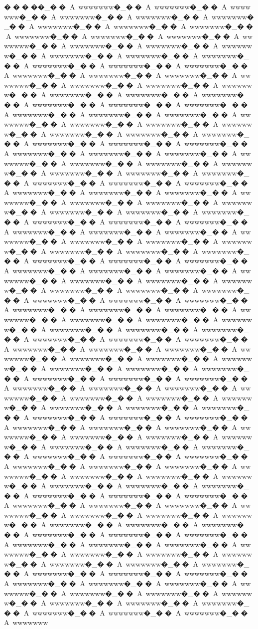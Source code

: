 {{{{{{{{{{{{{{{{{{{{{{{{{{{{{{{{{{{{{{{{{{{{{{{{{�����_��A~wwwwwww�_��A~wwwwwww�_��A~wwwwwww�_��A~wwwwwww�_��A~wwwwwww�_��A~wwwwwww�_��A~wwwwwww�_��A~wwwwwww�_��A~wwwwwww�_��A~wwwwwww�_��A~wwwwwww�_��A~wwwwwww�_��A~wwwwwww�_��A~wwwwwww�_��A~wwwwwww�_��A~wwwwwww�_��A~wwwwwww�_��A~wwwwwww�_��A~wwwwwww�_��A~wwwwwww�_��A~wwwwwww�_��A~wwwwwww�_��A~wwwwwww�_��A~wwwwwww�_��A~wwwwwww�_��A~wwwwwww�_��A~wwwwwww�_��A~wwwwwww�_��A~wwwwwww�_��A~wwwwwww�_��A~wwwwwww�_��A~wwwwwww�_��A~wwwwwww�_��A~wwwwwww�_��A~wwwwwww�_��A~wwwwwww�_��A~wwwwwww�_��A~wwwwwww�_��A~wwwwwww�_��A~wwwwwww�_��A~wwwwwww�_��A~wwwwwww�_��A~wwwwwww�_��A~wwwwwww�_��A~wwwwwww�_��A~wwwwwww�_��A~wwwwwww�_��A~wwwwwww�_��A~wwwwwww�_��A~wwwwwww�_��A~wwwwwww�_��A~wwwwwww�_��A~wwwwwww�_��A~wwwwwww�_��A~wwwwwww�_��A~wwwwwww�_��A~wwwwwww�_��A~wwwwwww�_��A~wwwwwww�_��A~wwwwwww�_��A~wwwwwww�_��A~wwwwwww�_��A~wwwwwww�_��A~wwwwwww�_��A~wwwwwww�_��A~wwwwwww�_��A~wwwwwww�_��A~wwwwwww�_��A~wwwwwww�_��A~wwwwwww�_��A~wwwwwww�_��A~wwwwwww�_��A~wwwwwww�_��A~wwwwwww�_��A~wwwwwww�_��A~wwwwwww�_��A~wwwwwww�_��A~wwwwwww�_��A~wwwwwww�_��A~wwwwwww�_��A~wwwwwww�_��A~wwwwwww�_��A~wwwwwww�_��A~wwwwwww�_��A~wwwwwww�_��A~wwwwwww�_��A~wwwwwww�_��A~wwwwwww�_��A~wwwwwww�_��A~wwwwwww�_��A~wwwwwww�_��A~wwwwwww�_��A~wwwwwww�_��A~wwwwwww�_��A~wwwwwww�_��A~wwwwwww�_��A~wwwwwww�_��A~wwwwwww�_��A~wwwwwww�_��A~wwwwwww�_��A~wwwwwww�_��A~wwwwwww�_��A~wwwwwww�_��A~wwwwwww�_��A~wwwwwww�_��A~wwwwwww�_��A~wwwwwww�_��A~wwwwwww�_��A~wwwwwww�_��A~wwwwwww�_��A~wwwwwww�_��A~wwwwwww�_��A~wwwwwww�_��A~wwwwwww�_��A~wwwwwww�_��A~wwwwwww�_��A~wwwwwww�_��A~wwwwwww�_��A~wwwwwww�_��A~wwwwwww�_��A~wwwwwww�_��A~wwwwwww�_��A~wwwwwww�_��A~wwwwwww�_��A~wwwwwww�_��A~wwwwwww�_��A~wwwwwww�_��A~wwwwwww�_��A~wwwwwww�_��A~wwwwwww�_��A~wwwwwww�_��A~wwwwwww�_��A~wwwwwww�_��A~wwwwwww�_��A~wwwwwww�_��A~wwwwwww�_��A~wwwwwww�_��A~wwwwwww�_��A~wwwwwww�_��A~wwwwwww�_��A~wwwwwww�_��A~wwwwwww�_��A~wwwwwww�_��A~wwwwwww�_��A~wwwwwww�_��A~wwwwwww�_��A~wwwwwww�_��A~wwwwwww�_��A~wwwwwww�_��A~wwwwwww�_��A~wwwwwww�_��A~wwwwwww�_��A~wwwwwww�_��A~wwwwwww�_��A~wwwwwww�_��A~wwwwwww�_��A~wwwwwww�_��A~wwwwwww�_��A~wwwwwww�_��A~wwwwwww�_��A~wwwwwww�_��A~wwwwwww�_��A~wwwwwww�_��A~wwwwwww�_��A~wwwwwww�_��A~wwwwwww�_��A~wwwwwww�_��A~wwwwwww�_��A~wwwwwww�_��A~wwwwwww�_��A~wwwwwww�_��A~wwwwwww�_��A~wwwwwww�_��A~wwwwwww�_��A~wwwwwww�_��A~wwwwwww�_��A~wwwwwww�_��A~wwwwwww�_��A~wwwwwww�_��A~wwwwwww�_��A~wwwwwww�_��A~wwwwwww�_��A~wwwwwww�_��A~wwwwwww�_��A~wwwwwww�_��A~wwwwwww�_��A~wwwwwww�_��A~wwwwwww�_��A~wwwwwww�_��A~wwwwwww�_��A~wwwwwww�_��A~wwwwwww�_��A~wwwwwww�_��A~wwwwwww�_��A~wwwwwww�_��A~wwwwwww�_��A~wwwwwww�_��A~wwwwwww�_��A~wwwwwww�_��A~wwwwwww�_��A~wwwwwww�_��A~wwwwwww�_��A~wwwwwww�_��A~wwwwwww�_��A~wwwwwww}}}}}}}}}}}}}}}}}}}}}}}}}}}}}}}}}}}}}}}}}}}}}}}}}
